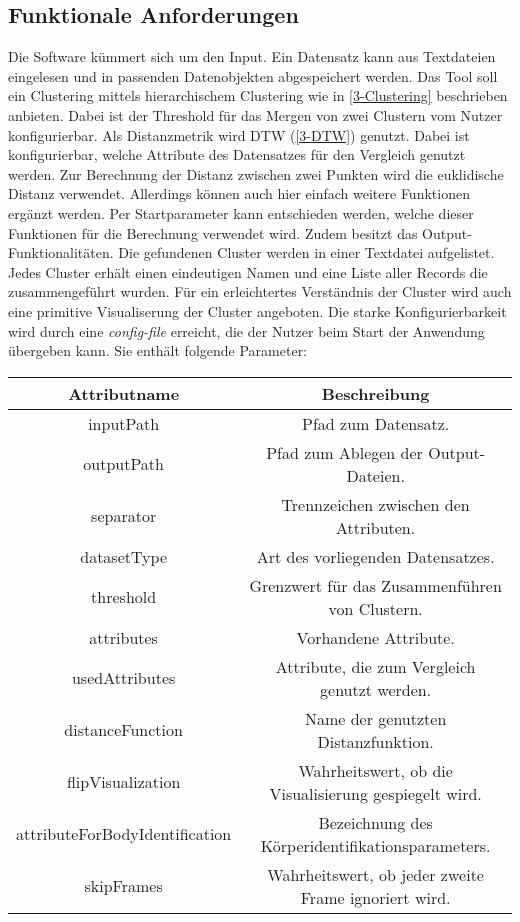 \subsection{Funktionale Anforderungen}
\label{4-FunktionaleAnforderungen}
Die Software kümmert sich um den Input.
Ein Datensatz kann aus Textdateien eingelesen und in passenden Datenobjekten abgespeichert werden.
Das Tool soll ein Clustering mittels hierarchischem Clustering wie in \autoref{3-Clustering} beschrieben anbieten.
Dabei ist der Threshold für das Mergen von zwei Clustern vom Nutzer konfigurierbar.
Als Distanzmetrik wird \ac{DTW} (\autoref{3-DTW}) genutzt.
Dabei ist konfigurierbar, welche Attribute des Datensatzes für den Vergleich genutzt werden.
Zur Berechnung der Distanz zwischen zwei Punkten wird die euklidische Distanz verwendet.
Allerdings können auch hier einfach weitere Funktionen ergänzt werden.
Per Startparameter kann entschieden werden, welche dieser Funktionen für die Berechnung verwendet wird.
Zudem besitzt das Output-Funktionalitäten.
Die gefundenen Cluster werden in einer Textdatei aufgelistet.
Jedes Cluster erhält einen eindeutigen Namen und eine Liste aller Records die zusammengeführt wurden.
Für ein erleichtertes Verständnis der Cluster wird auch eine primitive Visualiserung der Cluster angeboten.
Die starke Konfigurierbarkeit wird durch eine \emph{config-file} erreicht,
die der Nutzer beim Start der Anwendung übergeben kann.
Sie enthält folgende Parameter:

\begin{center}
    \begin{tabular}{ |c|c| } 
     \hline
     Attributname & Beschreibung \\
     \hline \hline
     inputPath & Pfad zum Datensatz. \\
     \hline
     outputPath & Pfad zum Ablegen der Output-Dateien.  \\
     \hline
     separator & Trennzeichen zwischen den Attributen. \\
     \hline
     datasetType & Art des vorliegenden Datensatzes. \\
     \hline
     threshold & Grenzwert für das Zusammenführen von Clustern. \\
     \hline
     attributes & Vorhandene Attribute. \\
     \hline
     usedAttributes & Attribute, die zum Vergleich genutzt werden. \\
     \hline
     distanceFunction & Name der genutzten Distanzfunktion. \\
     \hline
     flipVisualization & Wahrheitswert, ob die Visualisierung gespiegelt wird. \\
     \hline
     attributeForBodyIdentification & Bezeichnung des Körperidentifikationsparameters. \\
     \hline
     skipFrames & Wahrheitswert, ob jeder zweite Frame ignoriert wird. \\
     \hline
    \end{tabular}
  \end{center}

